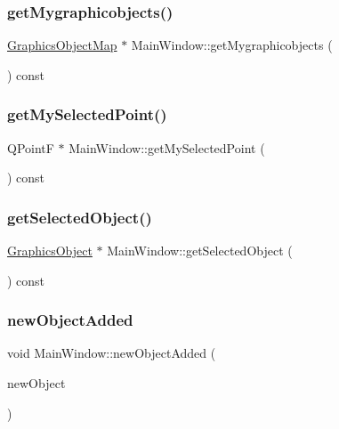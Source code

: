 \subsubsection{\texorpdfstring{get\+Mygraphicobjects()}{getMygraphicobjects()}}
{\footnotesize\ttfamily \hyperlink{class_graphics_object_map}{Graphics\+Object\+Map} $\ast$ Main\+Window\+::get\+Mygraphicobjects (\begin{DoxyParamCaption}{ }\end{DoxyParamCaption}) const}

\mbox{\label{class_main_window_a534d46f1227675db3c7c0a92eb525159}} 
\subsubsection{\texorpdfstring{get\+My\+Selected\+Point()}{getMySelectedPoint()}}
{\footnotesize\ttfamily Q\+PointF $\ast$ Main\+Window\+::get\+My\+Selected\+Point (\begin{DoxyParamCaption}{ }\end{DoxyParamCaption}) const}

\mbox{\label{class_main_window_a74ee7691487d90479ea2244f2815d01f}} 
\subsubsection{\texorpdfstring{get\+Selected\+Object()}{getSelectedObject()}}
{\footnotesize\ttfamily \hyperlink{class_graphics_object}{Graphics\+Object} $\ast$ Main\+Window\+::get\+Selected\+Object (\begin{DoxyParamCaption}{ }\end{DoxyParamCaption}) const}

\mbox{\label{class_main_window_abe7ef25ca37ca363b6c7f78ef548c69b}} 
\subsubsection{\texorpdfstring{new\+Object\+Added}{newObjectAdded}}
{\footnotesize\ttfamily void Main\+Window\+::new\+Object\+Added (\begin{DoxyParamCaption}\item[{\hyperlink{class_graphics_object_map}{Graphics\+Object\+Map}}]{new\+Object }\end{DoxyParamCaption})\hspace{0.3cm}{\ttfamily [signal]}}

